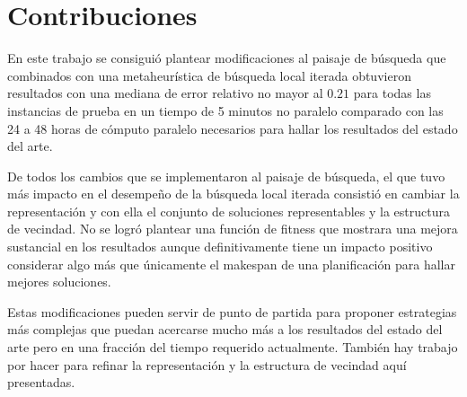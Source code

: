 \section{Contribuciones}
En este trabajo se consiguió plantear modificaciones al paisaje de búsqueda que combinados con una metaheurística de búsqueda local iterada obtuvieron resultados con una mediana de error relativo no mayor al $0.21$ para todas las instancias de prueba en un tiempo de 5 minutos no paralelo comparado con las 24 a 48 horas de cómputo paralelo necesarios para hallar los resultados del estado del arte.

De todos los cambios que se implementaron al paisaje de búsqueda, el que tuvo más impacto en el desempeño de la búsqueda local iterada consistió en cambiar la representación y con ella el conjunto de soluciones representables y la estructura de vecindad. No se logró plantear una función de fitness que mostrara una mejora sustancial en los resultados aunque definitivamente tiene un impacto positivo considerar algo más que únicamente el makespan de una planificación para hallar mejores soluciones.

Estas modificaciones pueden servir de punto de partida para proponer estrategias más complejas que puedan acercarse mucho más a los resultados del estado del arte pero en una fracción del tiempo requerido actualmente. También hay trabajo por hacer para refinar la representación y la estructura de vecindad aquí presentadas.


